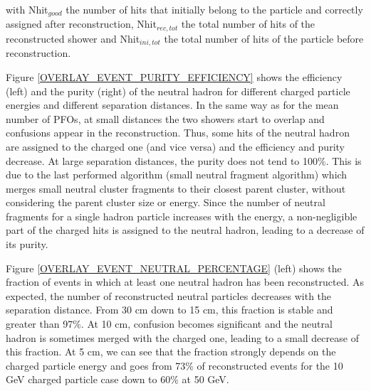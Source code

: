 \documentclass[12pt]{article}
\begin{document}
with Nhit$_{good}$ the number of hits that initially belong to the particle and correctly assigned after reconstruction, Nhit$_{rec,tot}$ the total number of hits of the reconstructed shower and Nhit$_{ini,tot}$ the total number of hits of the particle before reconstruction. 

Figure \ref{OVERLAY_EVENT_PURITY_EFFICIENCY} shows the efficiency (left) and the purity (right) of the neutral hadron for different charged particle energies and different separation distances. In the same way as for the mean number of PFOs, at small distances the two showers start to overlap and confusions appear in the reconstruction. Thus, some hits of the neutral hadron are assigned to the charged one (and vice versa) and the efficiency and purity decrease. At large separation distances, the purity does not tend to 100\%. This is due to the last performed algorithm (small neutral fragment algorithm) which merges small neutral cluster fragments to their closest parent cluster, without considering the parent cluster size or energy. Since the number of neutral fragments for a single hadron particle increases with the energy, a non-negligible part of the charged hits is assigned to the neutral hadron, leading to a decrease of its purity.

Figure \ref{OVERLAY_EVENT_NEUTRAL_PERCENTAGE} (left) shows the fraction of events in which at least one neutral hadron has been reconstructed. As expected, the number of reconstructed neutral particles decreases with the separation distance. From 30 cm down to 15 cm, this fraction is stable and greater than 97\%. At 10 cm, confusion becomes significant and the neutral hadron is sometimes merged with the charged one, leading to a small decrease of this fraction. At 5 cm, we can see that the fraction strongly depends on the charged particle energy and goes from 73\% of reconstructed events for the 10 GeV charged particle case down to 60\% at 50 GeV.
\end{document}

